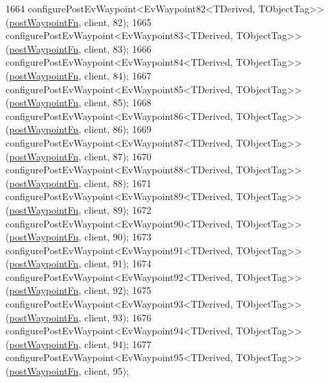 \begin{DoxyCode}
1664     configurePostEvWaypoint<EvWaypoint82<TDerived, TObjectTag>>(\hyperlink{classcl__move__base__z_1_1WaypointEventDispatcher_a964a57fcce5d48ec60243230722d8dd7}{postWaypointFn}, client, 82);
1665     configurePostEvWaypoint<EvWaypoint83<TDerived, TObjectTag>>(\hyperlink{classcl__move__base__z_1_1WaypointEventDispatcher_a964a57fcce5d48ec60243230722d8dd7}{postWaypointFn}, client, 83);
1666     configurePostEvWaypoint<EvWaypoint84<TDerived, TObjectTag>>(\hyperlink{classcl__move__base__z_1_1WaypointEventDispatcher_a964a57fcce5d48ec60243230722d8dd7}{postWaypointFn}, client, 84);
1667     configurePostEvWaypoint<EvWaypoint85<TDerived, TObjectTag>>(\hyperlink{classcl__move__base__z_1_1WaypointEventDispatcher_a964a57fcce5d48ec60243230722d8dd7}{postWaypointFn}, client, 85);
1668     configurePostEvWaypoint<EvWaypoint86<TDerived, TObjectTag>>(\hyperlink{classcl__move__base__z_1_1WaypointEventDispatcher_a964a57fcce5d48ec60243230722d8dd7}{postWaypointFn}, client, 86);
1669     configurePostEvWaypoint<EvWaypoint87<TDerived, TObjectTag>>(\hyperlink{classcl__move__base__z_1_1WaypointEventDispatcher_a964a57fcce5d48ec60243230722d8dd7}{postWaypointFn}, client, 87);
1670     configurePostEvWaypoint<EvWaypoint88<TDerived, TObjectTag>>(\hyperlink{classcl__move__base__z_1_1WaypointEventDispatcher_a964a57fcce5d48ec60243230722d8dd7}{postWaypointFn}, client, 88);
1671     configurePostEvWaypoint<EvWaypoint89<TDerived, TObjectTag>>(\hyperlink{classcl__move__base__z_1_1WaypointEventDispatcher_a964a57fcce5d48ec60243230722d8dd7}{postWaypointFn}, client, 89);
1672     configurePostEvWaypoint<EvWaypoint90<TDerived, TObjectTag>>(\hyperlink{classcl__move__base__z_1_1WaypointEventDispatcher_a964a57fcce5d48ec60243230722d8dd7}{postWaypointFn}, client, 90);
1673     configurePostEvWaypoint<EvWaypoint91<TDerived, TObjectTag>>(\hyperlink{classcl__move__base__z_1_1WaypointEventDispatcher_a964a57fcce5d48ec60243230722d8dd7}{postWaypointFn}, client, 91);
1674     configurePostEvWaypoint<EvWaypoint92<TDerived, TObjectTag>>(\hyperlink{classcl__move__base__z_1_1WaypointEventDispatcher_a964a57fcce5d48ec60243230722d8dd7}{postWaypointFn}, client, 92);
1675     configurePostEvWaypoint<EvWaypoint93<TDerived, TObjectTag>>(\hyperlink{classcl__move__base__z_1_1WaypointEventDispatcher_a964a57fcce5d48ec60243230722d8dd7}{postWaypointFn}, client, 93);
1676     configurePostEvWaypoint<EvWaypoint94<TDerived, TObjectTag>>(\hyperlink{classcl__move__base__z_1_1WaypointEventDispatcher_a964a57fcce5d48ec60243230722d8dd7}{postWaypointFn}, client, 94);
1677     configurePostEvWaypoint<EvWaypoint95<TDerived, TObjectTag>>(\hyperlink{classcl__move__base__z_1_1WaypointEventDispatcher_a964a57fcce5d48ec60243230722d8dd7}{postWaypointFn}, client, 95);

\end{DoxyCode}
